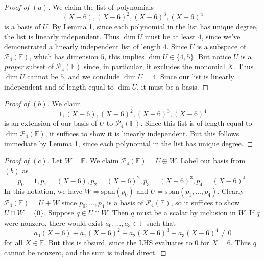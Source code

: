 \documentclass[11pt]{extarticle}
\newcommand{\F}{\mathbb{F}}
\newcommand{\Span}{\mathrm{span}}
\begin{document}
\begin{proof}[Proof of $(a)$]
We claim the list of polynomials
\begin{equation*}
(X - 6), (X - 6)^2, (X - 6)^3, (X-6)^4
\end{equation*}
is a basis of $U$.  By Lemma 1, since each polynomial in the list has unique degree, the list is linearly independent.  Thus $\dim U$ must be at least $4$, since we've demonstrated a linearly independent list of length $4$.  Since $U$ is a subspace of $\mathcal{P}_4(\F)$, which has dimension $5$, this implies $\dim U\in\{4,5\}$.  But notice $U$ is a \emph{proper} subset of $\mathcal{P}_4(\F)$ since, in particular, it excludes the monomial $X$.  Thus $\dim U$ cannot be $5$, and we conclude $\dim U = 4$.  Since our list is linearly independent and of length equal to $\dim U$, it must be a basis.
\end{proof}
\begin{proof}[Proof of $(b)$]
We claim 
\begin{equation*}
1, (X - 6), (X - 6)^2, (X - 6)^3, (X-6)^4
\end{equation*}
is an extension of our basis of $U$ to $\mathcal{P}_4(\F)$.  Since this list is of length equal to $\dim\mathcal{P}_4(\F)$, it suffices to show it is linearly independent.  But this follows immediate by Lemma 1, since each polynomial in the list has unique degree.
\end{proof}
\begin{proof}[Proof of $(c)$]
Let $W = \F$.  We claim $\mathcal{P}_4(\F)=U\oplus W$.  Label our basis from $(b)$ as
\begin{equation*}
p_0=1, p_1=(X - 6), p_2=(X - 6)^2, p_3=(X - 6)^3, p_4=(X-6)^4.
\end{equation*}
In this notation, we have $W = \Span(p_0)$ and $U=\Span(p_1,\dots,p_4)$.  Clearly $\mathcal{P}_4(\F)=U+W$ since $p_0,\dots,p_4$ is a basis of $\mathcal{P}_4(\F)$, so it suffices to show $U\cap W = \{0\}$.  Suppose $q\in U\cap W$.  Then $q$ must be a scalar by inclusion in $W$.  If $q$ were nonzero, there would exist $a_0,\dots,a_3\in \F$ such that
\begin{equation*}
a_0(X-6) + a_1(X-6)^2 + a_2(X-6)^3 + a_3(X-6)^4 \neq 0
\end{equation*}
for all $X\in\F$.  But this is absurd, since the LHS evaluates to $0$ for $X=6$.  Thus $q$ cannot be nonzero, and the sum is indeed direct. 
\end{proof}
\end{document}
